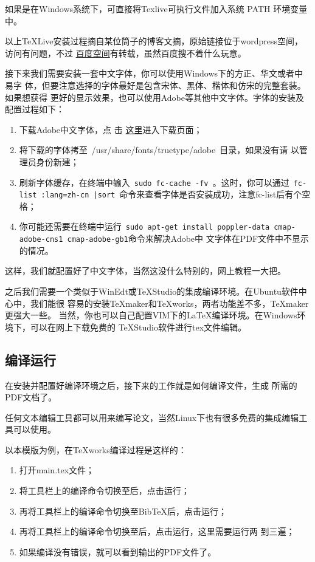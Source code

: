 如果是在Windows系统下，可直接将Texlive可执行文件加入系统 PATH 环境变量中。

以上\TeX{}Live安装过程摘自某位筒子的博客文摘，原始链接位于wordpress空间，
访问有问题，不过
\href{http://hi.baidu.com/skubuntu/blog/item/89e8de2f73a465e08a1399a3.html}{
  百度空间}有转载，虽然百度搜不着什么玩意。

接下来我们需要安装一套中文字体，你可以使用Windows下的方正、华文或者中易字
体，但要注意选择的字体最好是包含宋体、黑体、楷体和仿宋的完整套装。如果想获得
更好的显示效果，也可以使用Adobe等其他中文字体。字体的安装及配置过程如下：

\begin{enumerate}
\item 下载Adobe中文字体，点
  击
  \href{http://forum.ubuntu.org.cn/viewtopic.php?f=35&t=180987&start=0}{
    这里}进入下载页面；
\item 将下载的字体拷至~{/usr/share/fonts/truetype/adobe}~目录，如果没有请
  以管理员身份新建；
\item 刷新字体缓存，在终端中输入~\texttt{\footnotesize sudo fc-cache -fv }。这时，你可以通过~\texttt{\footnotesize fc-list :lang=zh-cn |sort}~命令来查看字体是否安装成功，注意fc-list后有个空格；
\item 你可能还需要在终端中运行~\texttt{\footnotesize sudo apt-get
    install poppler-data cmap-adobe-cns1 cmap-adobe-gb1}命令来解决Adobe中
  文字体在PDF文件中不显示的情况。
\end{enumerate}

这样，我们就配置好了中文字体，当然这没什么特别的，网上教程一大把。

之后我们需要一个类似于WinEdt或TeXStudio的集成编译环境。在Ubuntu软件中心中，我们能很
容易的安装\TeX{}maker和\TeX{}works，两者功能差不多，\TeX{}maker更强大一些。
当然，你也可以自己配置VIM下的\LaTeX{}编译环境。在Windows环境下，可以在网上下载免费的
TeXStudio软件进行tex文件编辑。

\subsection{编译运行}

在安装并配置好编译环境之后，接下来的工作就是如何编译\XeLaTeX{}文件，生成
所需的PDF文档了。

任何文本编辑工具都可以用来编写论文，当然Linux下也有很多免费的集成编辑工具可以使用。

以本模版为例，在\TeX{}works编译过程是这样的：
\begin{enumerate}
\item 打开main.tex文件；
\item 将工具栏上的编译命令切换至\XeLaTeX{}后，点击运行；
\item 再将工具栏上的编译命令切换至Bib\TeX{}后，点击运行；
\item 再将工具栏上的编译命令切换至\XeLaTeX{}后，点击运行，这里需要运行两
  到三遍；
\item 如果编译没有错误，就可以看到输出的PDF文件了。
\end{enumerate}

